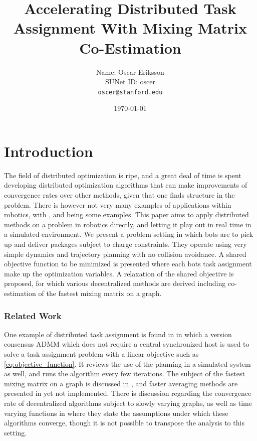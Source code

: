 \documentclass{article}
\title{{\large \bf Accelerating Distributed Task Assignment With Mixing Matrix Co-Estimation}}
\author{Name: Oscar Eriksson \\ SUNet ID: oscer \\ \texttt{oscer@stanford.edu}}
\date{\monthyeardate\today}
\newcommand{\sectiontype}{}
\begin{document}
\maketitle
\section*{Introduction}
\renewcommand{\sectiontype}{Introduction}
The field of distributed optimization is ripe, and a great deal of time is spent developing distributed optimization algorithms that can make improvements of convergence rates over other methods, given that one finds structure in the problem. There is however not very many examples of applications within robotics, with \cite{haksar2022consensus}, \cite{shorinwa2020distributed} and \cite{jadbabaie2003coordination} being some examples. This paper aims to apply distributed methods on a problem in robotics directly, and letting it play out in real time in a simulated environment. We present a problem setting in which bots are to pick up and deliver packages subject to charge constraints. They operate using very simple dynamics and trajectory planning with no collision avoidance. A shared objective function to be minimized is presented where each bots task assignment make up the optimization variables. A relaxation of the shared objective is proposed, for which various decentralized methods are derived including co-estimation of the fastest mixing matrix on a graph.

\subsubsection*{Related Work}
One example of distributed task assignment is found in \cite{shorinwa2023distributed} in which a version consensus ADMM which does not require a central synchronized host is used to solve a task assignment problem with a linear objective such as \eqref{eq:objective_function}. It reviews the use of the planning in a simulated system as well, and runs the algorithm every few iterations.
The subject of the fastest mixing matrix on a graph is discussed in \cite{xiao2004fast}, and faster averaging methods are presented in \cite{johansson2008faster} yet not implemented. There is discussion regarding the convergence rate of decentralized algorithms subject to slowly varying graphs, as well as time varying functions in \cite{rogozin2019optimal} where they state the assumptions under which these algorithms converge, though it is not possible to transpose the analysis to this setting.
\end{document}
